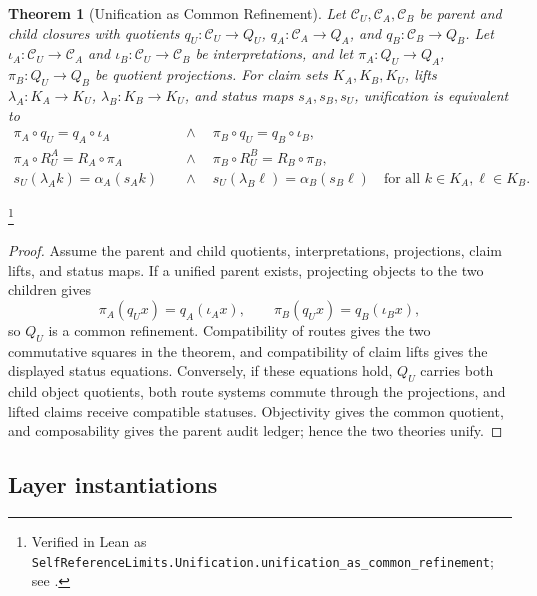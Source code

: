 \documentclass[11pt]{article}
\newtheorem{theorem}{Theorem}[section]
\theoremstyle{definition}
\begin{document}
\begin{theorem}[Unification as Common Refinement]\label{thm:F51}
Let \(\mathcal C_U,\mathcal C_A,\mathcal C_B\) be parent and child
closures with quotients \(q_U:\mathcal C_U\to Q_U\),
\(q_A:\mathcal C_A\to Q_A\), and \(q_B:\mathcal C_B\to Q_B\). Let
\(\iota_A:\mathcal C_U\to\mathcal C_A\) and
\(\iota_B:\mathcal C_U\to\mathcal C_B\) be interpretations, and let
\(\pi_A:Q_U\to Q_A\), \(\pi_B:Q_U\to Q_B\) be quotient projections.
For claim sets \(K_A,K_B,K_U\), lifts
\(\lambda_A:K_A\to K_U\), \(\lambda_B:K_B\to K_U\), and status maps
\(s_A,s_B,s_U\), unification is equivalent to
\begin{align*}
  \pi_A\circ q_U=q_A\circ\iota_A
  &\quad\wedge\quad
  \pi_B\circ q_U=q_B\circ\iota_B,\\
  \pi_A\circ R_U^A=R_A\circ\pi_A
  &\quad\wedge\quad
  \pi_B\circ R_U^B=R_B\circ\pi_B,\\
  s_U(\lambda_A k)=\alpha_A(s_A k)
  &\quad\wedge\quad
  s_U(\lambda_B \ell)=\alpha_B(s_B \ell)
  \quad\text{for all }k\in K_A,\ell\in K_B .
\end{align*}
\end{theorem}
\footnote{\raggedright Verified in Lean as
\texttt{SelfReferenceLimits.\allowbreak{}Unification.\allowbreak{}unification\_as\_common\_refinement};
see .}
\begin{proof}
Assume the parent and child quotients, interpretations, projections,
claim lifts, and status maps. If a unified parent exists, projecting
objects to the two children gives
\[
  \pi_A(q_U x)=q_A(\iota_A x),
  \qquad
  \pi_B(q_U x)=q_B(\iota_B x),
\]
so \(Q_U\) is a common refinement. Compatibility of routes gives the
two commutative squares in the theorem, and compatibility of claim
lifts gives the displayed status equations. Conversely, if these
equations hold, \(Q_U\) carries both child object quotients, both route
systems commute through the projections, and lifted claims receive
compatible statuses. Objectivity gives the common quotient, and
composability gives the parent audit ledger; hence the two theories
unify.
\end{proof}

\subsection*{Layer instantiations}\label{layer-inst:F51}
\end{document}

